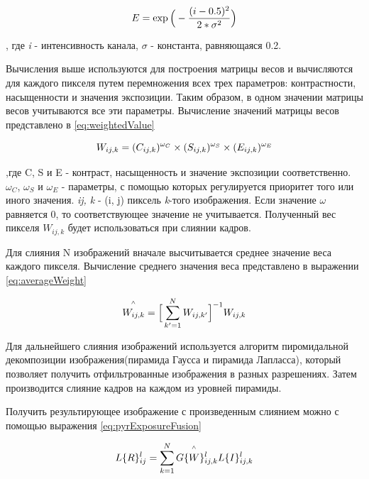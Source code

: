 \begin{equation}
    \centering{
        E = \exp{\Big(-\frac{(i-0.5)^2}{2*\sigma^2}\Big)}}
    \label{eq:well-exposedness}
\end{equation}

, где \textit{i} - интенсивность канала, \textit{$\sigma$} - константа, равняющаяся 0.2.

Вычисления выше используются для построения матрицы весов и вычисляются для каждого пикселя путем перемножения всех трех параметров: контрастности, насыщенности и значения экспозиции. Таким образом, в одном значении матрицы весов учитываются все эти параметры. Вычисление значений матрицы весов представлено в \ref{eq:weightedValue}

\begin{equation}
    \centering{
        W_{ij,k} = (C_{ij,k})^{\omega_{C}} \times (S_{ij,k})^{\omega_{S}} \times (E_{ij,k})^{\omega_{E}}}
    \label{eq:weightedValue}
\end{equation}

,где C, S и E - контраст, насыщенность и значение экспозиции соответственно. \textit{$\omega_{C}$}, \textit{$\omega_{S}$} и \textit{$\omega_{E}$} - параметры, с помощью которых регулируется приоритет того или иного значения. \textit{ij, k} - (i, j) пиксель \textit{k}-того изображения. Если значение $\omega$ равняется 0, то соответствующее значение не учитывается. Полученный вес пикселя \textit{$W_{ij,k}$} будет использоваться при слиянии кадров.

Для слияния N изображений вначале высчитывается среднее значение веса каждого пикселя. Вычисление среднего значения веса представлено в выражении \ref{eq:averageWeight}

\begin{equation}
    \centering{
        \overset{^\wedge}{W_{ij,k}} = \Big[\sum_{k'=1}^{N}W_{ij,k'}\Big]^{-1}W_{ij,k}}
    \label{eq:averageWeight}
\end{equation}

Для дальнейшего слияния изображений используется алгоритм пиромидальной декомпозиции изображения(пирамида Гаусса и пирамида Лапласса)\cite{bib8}, который позволяет получить отфильтрованные изображения в разных разрешениях. Затем производится слияние кадров на каждом из уровней пирамиды. 

Получить результирующее изображение с произведенным слиянием можно с помощью выражения \ref{eq:pyrExposureFusion}

\begin{equation}
    \centering{
        L\{R\}_{ij}^{l} = \sum_{k=1}^{N}G\{\overset{^\wedge}{W}\}_{ij,k}^{l}L\{I\}_{ij,k}^{l}}
    \label{eq:pyrExposureFusion}
\end{equation}

